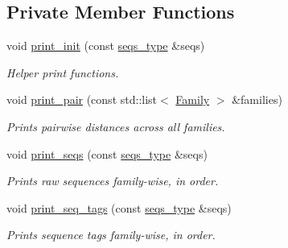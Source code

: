 \subsection*{Private Member Functions}
\textbf{ }\par
\begin{DoxyCompactItemize}
\item 
void \hyperlink{classretrocombinator_1_1Output_a365f66ac8299882ebfd6239d4c90b1bb}{print\+\_\+init} (const \hyperlink{classretrocombinator_1_1Output_a2df584f5a2dbb2bf4a6789118902d83c}{seqs\+\_\+type} \&seqs)
\begin{DoxyCompactList}\small\item\em Helper print functions. \end{DoxyCompactList}\item 
void \hyperlink{classretrocombinator_1_1Output_ac5632b57357788ba7d25769c412a2a11}{print\+\_\+pair} (const std\+::list$<$ \hyperlink{classretrocombinator_1_1Family}{Family} $>$ \&families)
\begin{DoxyCompactList}\small\item\em Prints pairwise distances across all families. \end{DoxyCompactList}\item 
\mbox{\label{classretrocombinator_1_1Output_ac56d04591e50cbb8170da04a5ffa233a}} 
void \hyperlink{classretrocombinator_1_1Output_ac56d04591e50cbb8170da04a5ffa233a}{print\+\_\+seqs} (const \hyperlink{classretrocombinator_1_1Output_a2df584f5a2dbb2bf4a6789118902d83c}{seqs\+\_\+type} \&seqs)
\begin{DoxyCompactList}\small\item\em Prints raw sequences family-\/wise, in order. \end{DoxyCompactList}\item 
\mbox{\label{classretrocombinator_1_1Output_a89392e3e01808946eaeb160955e87b21}} 
void \hyperlink{classretrocombinator_1_1Output_a89392e3e01808946eaeb160955e87b21}{print\+\_\+seq\+\_\+tags} (const \hyperlink{classretrocombinator_1_1Output_a2df584f5a2dbb2bf4a6789118902d83c}{seqs\+\_\+type} \&seqs)
\begin{DoxyCompactList}\small\item\em Prints sequence tags family-\/wise, in order. \end{DoxyCompactList}\end{DoxyCompactItemize}

